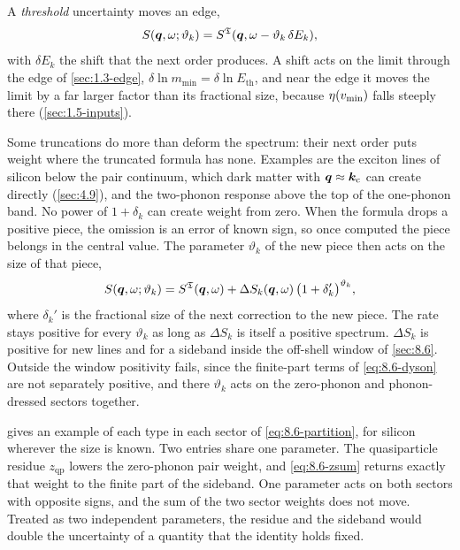 A \emph{threshold} uncertainty moves an edge,
\begin{equation}
  S(\bm{q},\omega;\vartheta_k) = S^{\mathfrak{T}}(\bm{q},\omega - \vartheta_k\,\delta E_k) ,
  \label{eq:8.8-shift}
\end{equation}
with $\delta E_k$ the shift that the next order produces. A shift acts on the limit through the edge of \cref{sec:1.3-edge}, $\delta\ln m_{\mathrm{min}} = \delta\ln E_{\mathrm{th}}$, and near the edge it moves the limit by a far larger factor than its fractional size, because $\eta(v_{\mathrm{min}})$ falls steeply there (\cref{sec:1.5-inputs}).

Some truncations do more than deform the spectrum: their next order puts weight where the truncated formula has none. Examples are the exciton lines of silicon below the pair continuum, which dark matter with $\bm{q} \approx \bm{k}_{\mathrm{c}}$ can create directly (\cref{sec:4.9}), and the two-phonon response above the top of the one-phonon band. No power of $1 + \delta_k$ can create weight from zero. When the formula drops a positive piece, the omission is an error of known sign, so once computed the piece belongs in the central value. The parameter $\vartheta_k$ of the new piece then acts on the size of that piece,
\begin{equation}
  S(\bm{q},\omega;\vartheta_k) = S^{\mathfrak{T}}(\bm{q},\omega) + \Delta S_k(\bm{q},\omega)\,\bigl(1 + \delta_k'\bigr)^{\vartheta_k} ,
  \label{eq:8.8-open}
\end{equation}
where $\delta_k'$ is the fractional size of the next correction to the new piece. The rate stays positive for every $\vartheta_k$ as long as $\Delta S_k$ is itself a positive spectrum. $\Delta S_k$ is positive for new lines and for a sideband inside the off-shell window of \cref{sec:8.6}. Outside the window positivity fails, since the finite-part terms of \cref{eq:8.6-dyson} are not separately positive, and there $\vartheta_k$ acts on the zero-phonon and phonon-dressed sectors together.

 gives an example of each type in each sector of \cref{eq:8.6-partition}, for silicon wherever the size is known. Two entries share one parameter. The quasiparticle residue $z_{\mathrm{qp}}$ lowers the zero-phonon pair weight, and \cref{eq:8.6-zsum} returns exactly that weight to the finite part of the sideband. One parameter acts on both sectors with opposite signs, and the sum of the two sector weights does not move. Treated as two independent parameters, the residue and the sideband would double the uncertainty of a quantity that the identity holds fixed.

